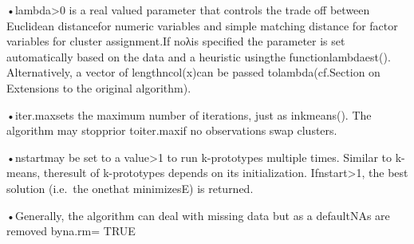\documentclass[
]{article}
\begin{document}
•lambda\textgreater0 is a real valued parameter that controls the trade
off between Euclidean distancefor numeric variables and simple matching
distance for factor variables for cluster assignment.If noλis specified
the parameter is set automatically based on the data and a heuristic
usingthe functionlambdaest(). Alternatively, a vector of
lengthncol(x)can be passed tolambda(cf.Section on Extensions to the
original algorithm).

•iter.maxsets the maximum number of iterations, just as inkmeans(). The
algorithm may stopprior toiter.maxif no observations swap clusters.

•nstartmay be set to a value\textgreater1 to run k-prototypes multiple
times. Similar to k-means, theresult of k-prototypes depends on its
initialization. Ifnstart\textgreater1, the best solution (i.e.~the
onethat minimizesE) is returned.

•Generally, the algorithm can deal with missing data but as a defaultNAs
are removed byna.rm= TRUE
\end{document}
